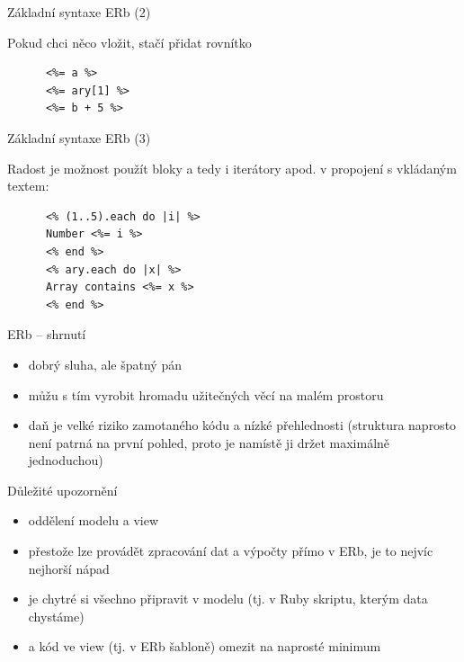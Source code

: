 \documentclass{beamer}
\begin{document}
\begin{frame}[fragile]{Základní syntaxe ERb (2)}
  \begin{block}{ }
    Pokud chci něco vložit, stačí přidat rovnítko
    \scriptsize
    \begin{verbatim}
      <%= a %>
      <%= ary[1] %>
      <%= b + 5 %>
    \end{verbatim}
  \end{block}
\end{frame}

\begin{frame}[fragile]{Základní syntaxe ERb (3)}
  \begin{block}{ }
    Radost je možnost použít bloky a tedy i iterátory apod. v propojení s vkládaným textem:
    \scriptsize
    \begin{verbatim}
      <% (1..5).each do |i| %>
      Number <%= i %>
      <% end %>
      <% ary.each do |x| %>
      Array contains <%= x %>
      <% end %>
    \end{verbatim}
  \end{block}
\end{frame}

\begin{frame}{ERb -- shrnutí}
  \begin{itemize}
    \item dobrý sluha, ale špatný pán
    \item můžu s tím vyrobit hromadu užitečných věcí na malém prostoru
    \item daň je velké riziko zamotaného kódu a nízké přehlednosti (struktura naprosto není patrná na první pohled, proto je namístě ji držet maximálně jednoduchou)
  \end{itemize}
\end{frame}

\begin{frame}{Důležité upozornění}
  \begin{itemize}
    \item oddělení modelu a view
    \item přestože lze provádět zpracování dat a výpočty přímo v ERb, je to nejvíc nejhorší nápad
    \item je chytré si všechno připravit v modelu (tj. v Ruby skriptu, kterým data chystáme)
    \item a kód ve view (tj. v ERb šabloně) omezit na naprosté minimum
  \end{itemize}
\end{frame}
\end{document}

